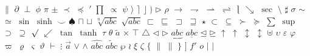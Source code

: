   $\parallel$
  $\partial$
  $\perp$
  $\phi$
  $\pi$
  $\pm$
  $\prec$
  $\preceq$
  $\prime$
  $\prod$
  $\propto$
  $\psi$
  $\rangle$
  $\rceil$
  $\rfloor$
  $\rgroup$
  $\rhd$
  $\rho$
  $\rightarrow$
  $\rightharpoondown$
  $\rightharpoonup$
  $\rightleftharpoons$
  $\rmoustache$
  $\searrow$
  $\sec$
  $\setminus$
  $\sharp$
  $\sigma$
  $\sim$
  $\simeq$
  $\sin$
  $\sinh$
  $\smile$
  $\spadesuit$
  $\sqcap$
  $\sqcup$
  $\sqrt[n]{abc}$
  $\sqrt{abc}$
  $\sqsubset$
  $\sqsubseteq$
  $\sqsupset$
  $\sqsupseteq$
  $\star$
  $\subset$
  $\subseteq$
  $\succ$
  $\succeq$
  $\sum$
  $\sup$
  $\supset$
  $\supseteq$
  $\surd$
  $\swarrow$
  $\tan$
  $\tanh$
  $\tau$
  $\theta$
  $\tilde{a}$
  $\times$
  $\top$
  $\triangle$
  $\triangleleft$
  $\triangleright$
  $\underbrace{abc}$
  $\underline{abc}$
  $\unlhd$
  $\unrhd$
  $\uparrow$
  $\uparrow$
  $\updownarrow$
  $\updownarrow$
  $\uplus$
  $\upsilon$
  $\varepsilon$
  $\varphi$
  $\varpi$
  $\varrho$
  $\varsigma$
  $\vartheta$
  $\vdash$
  $\vdots$
  $\vec{a}$
  $\vee$
  $\wedge$
  $\widehat{abc}$
  $\widetilde{abc}$
  $\wp$
  $\wr$
  $\xi$
  $\zeta$
  $\{$
  $\|$
  $\|$
  $\}$
  $]$
  $f'$
  $o$
  $|$
  $|$

